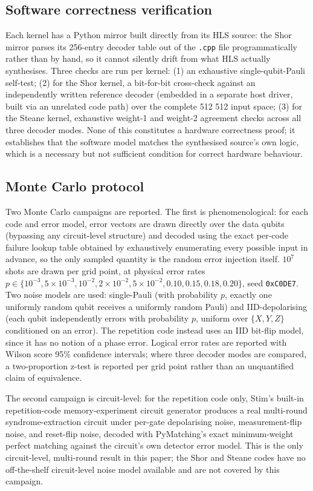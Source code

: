 \subsection{Software correctness verification}\label{subsec:meth-correctness}
Each kernel has a Python mirror built directly from its HLS source: the Shor mirror parses its 256-entry decoder table out of the \texttt{.cpp} file programmatically rather than by hand, so it cannot silently drift from what HLS actually synthesises. Three checks are run per kernel: (1) an exhaustive single-qubit-Pauli self-test; (2) for the Shor kernel, a bit-for-bit cross-check against an independently written reference decoder (embedded in a separate host driver, built via an unrelated code path) over the complete 512\,\texttimes\,512 input space; (3) for the Steane kernel, exhaustive weight-1 and weight-2 agreement checks across all three decoder modes. None of this constitutes a hardware correctness proof; it establishes that the software model matches the synthesised source's own logic, which is a necessary but not sufficient condition for correct hardware behaviour.

\subsection{Monte Carlo protocol}\label{subsec:meth-mc}
Two Monte Carlo campaigns are reported. The first is phenomenological: for each code and error model, error vectors are drawn directly over the data qubits (bypassing any circuit-level structure) and decoded using the exact per-code failure lookup table obtained by exhaustively enumerating every possible input in advance, so the only sampled quantity is the random error injection itself. \(10^7\) shots are drawn per grid point, at physical error rates \(p \in \{10^{-3}, 5\times10^{-3}, 10^{-2}, 2\times10^{-2}, 5\times10^{-2}, 0.10, 0.15, 0.18, 0.20\}\), seed \texttt{0xC0DE7}. Two noise models are used: single-Pauli (with probability \(p\), exactly one uniformly random qubit receives a uniformly random Pauli) and IID-depolarising (each qubit independently errors with probability \(p\), uniform over \(\{X,Y,Z\}\) conditioned on an error). The repetition code instead uses an IID bit-flip model, since it has no notion of a phase error. Logical error rates are reported with Wilson score 95\% confidence intervals; where three decoder modes are compared, a two-proportion z-test is reported per grid point rather than an unquantified claim of equivalence.

The second campaign is circuit-level: for the repetition code only, Stim's built-in repetition-code memory-experiment circuit generator produces a real multi-round syndrome-extraction circuit under per-gate depolarising noise, measurement-flip noise, and reset-flip noise, decoded with PyMatching's exact minimum-weight perfect matching against the circuit's own detector error model. This is the only circuit-level, multi-round result in this paper; the Shor and Steane codes have no off-the-shelf circuit-level noise model available and are not covered by this campaign.

